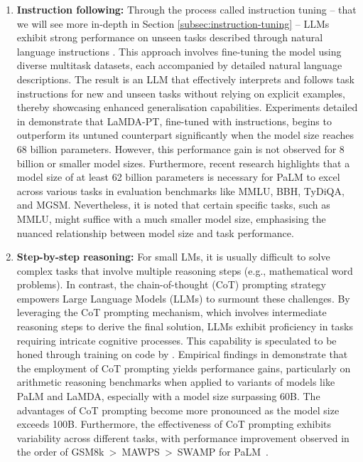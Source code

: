 \begin{enumerate}
{\begin{enumerate}
{\begin{quote}
					            \textit{Output:} {\enquote{Le renard brun rapide saute par-dessus le chien paresseux.}}\\
					            \textbf{Arithmetic Tasks:} \\
					            \textit{Input:} {\enquote{What is the sum of 42 and 63?}} \\
					            \textit{Output:} {\enquote{The sum of 42 and 63 is 105.}}
				            \end{quote}
			            }
			      \item \textbf{Instruction following:}{
				            Through the process called instruction tuning -- that we will see more in-depth in Section  \ref{subsec:instruction-tuning} -- LLMs exhibit strong performance on unseen tasks described through natural language instructions \cite{sanhetal2022multitask, ouyang2022training, wei2022fine}.
				            This approach involves fine-tuning the model using diverse multitask datasets, each accompanied by detailed natural language descriptions. The result is an LLM that effectively interprets and follows task instructions for new and unseen tasks without relying on explicit examples, thereby showcasing enhanced generalisation capabilities.
				            Experiments detailed in \textcite{wei2022fine} demonstrate that LaMDA-PT, fine-tuned with instructions, begins to outperform its untuned counterpart significantly when the model size reaches 68 billion parameters. However, this performance gain is not observed for 8 billion or smaller model sizes. Furthermore, recent research \cite{chung2022scaling} highlights that a model size of at least 62 billion parameters is necessary for PaLM to excel across various tasks in evaluation benchmarks like MMLU, BBH, TyDiQA, and MGSM. Nevertheless, it is noted that certain specific tasks, such as MMLU, might suffice with a much smaller model size, emphasising the nuanced relationship between model size and task performance.
			            }
			      \item \textbf{Step-by-step reasoning:} { For small LMs, it is usually difficult to solve complex tasks that involve multiple reasoning steps (e.g., mathematical word problems).
				            In contrast, the chain-of-thought (CoT) prompting strategy \cite{wei2022chain} empowers Large Language Models (LLMs) to surmount these challenges. By leveraging the CoT prompting mechanism, which involves intermediate reasoning steps to derive the final solution, LLMs exhibit proficiency in tasks requiring intricate cognitive processes. This capability is speculated to be honed through training on code by \textcite{wei2022chain}. Empirical findings in \textcite{wei2022chain} demonstrate that the employment of CoT prompting yields performance gains, particularly on arithmetic reasoning benchmarks when applied to variants of models like PaLM and LaMDA, especially with a model size surpassing 60B. The advantages of CoT prompting become more pronounced as the model size exceeds 100B. Furthermore, the effectiveness of CoT prompting exhibits variability across different tasks, with performance improvement observed in the order of GSM8k~\textgreater~MAWPS~\textgreater~SWAMP for PaLM~\cite{wei2022chain}.
}
\end{enumerate}}
\end{enumerate}
